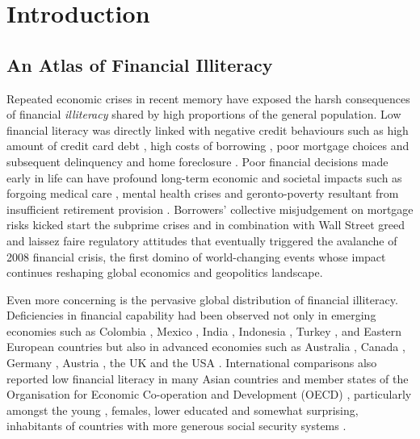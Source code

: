 \section{Introduction}\label{chp:1}

\subsection{An Atlas of Financial Illiteracy}

Repeated economic crises in recent memory have exposed the harsh consequences of financial \emph{illiteracy} shared by high proportions of the general population. Low financial literacy was directly linked with negative credit behaviours such as high amount of credit card debt \citep{norvilitis:2010}, high costs of borrowing \citep{huston:2012, pak:2018}, poor mortgage choices \citep{cox:2015} and subsequent delinquency and home foreclosure \citep{agarwal:2015a, gerardi:2010}. Poor financial decisions made early in life can have profound long-term economic and societal impacts \citep{montoya:2013} such as forgoing medical care \citep{lusardi:2015}, mental health crises \citep{stone:2018} and geronto-poverty resultant from insufficient retirement provision \citep{lusardi:2007, lusardi:2008}. Borrowers' collective misjudgement on mortgage risks kicked start the subprime crises and in combination with Wall Street greed and laissez faire regulatory attitudes that eventually triggered the avalanche of 2008 financial crisis, the first domino of world-changing events whose impact continues reshaping global economics and geopolitics landscape.

Even more concerning is the pervasive global distribution of financial illiteracy. Deficiencies in financial capability had been observed not only in emerging economies \citep{karakurumozdemir:2019} such as Colombia \citep{caoalvira:2020}, Mexico \citep{arceogomez:2017, bohm:2021}, India \citep{agarwal:2015b, kiliyanni:2016, utkarsh:2020}, Indonesia \citep{cole:2009, khoirunnisaa:2020}, Turkey \citep{akbenselcuk:2014}, and Eastern European countries \citep{belas:2016, opletalova:2015, reiter:2020} but also in advanced economies such as Australia \citep{ali:2014, taylor:2013, thomson:2017}, Canada \citep{boisclair:2017}, Germany \citep{bucherkoenen:2017, erner:2016}, Austria \citep{silgoner:2015}, the UK \citep{barnard:2021} and the USA \citep{breitbach:2016, gale:2012, lusardi:2010}. International comparisons also reported low financial literacy in many Asian countries \citep{yoshino:2015} and member states of the Organisation for Economic Co-operation and Development (OECD) \citep{cupak:2018a, lusardi:2015a}, particularly amongst the young \citep{debeckker:2019}, females, lower educated \citep{klapper:2019} and somewhat surprising, inhabitants of countries with more generous social security systems \citep{jappelli:2010}.

